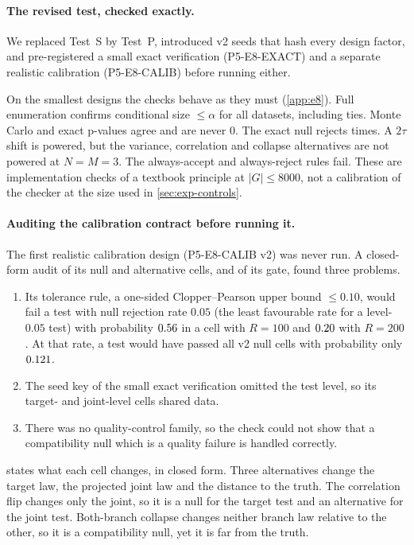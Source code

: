 \documentclass{article}
\theoremstyle{plain}
\theoremstyle{definition}
\theoremstyle{remark}
\begin{document}
\paragraph{The revised test, checked exactly.}\label{sec:e8summary}
We replaced Test~S by Test~P, introduced v2 seeds that hash every design factor, and pre-registered a small exact verification (P5-E8-EXACT) and a separate realistic calibration (P5-E8-CALIB) before running either.

On the smallest designs the checks behave as they must (\cref{app:e8}).
Full enumeration confirms conditional size $\le\alpha$ for all \numEeightAdatasets{} datasets, including ties. Monte Carlo and exact p-values agree and are never $0$. The exact null rejects \numEeightNullK{} times.
A $2\tau$ shift is powered, but the variance, correlation and collapse alternatives are not powered at $N=M=3$. The always-accept and always-reject rules fail.
These are implementation checks of a textbook principle at $|G|\le 8000$, not a calibration of the checker at the size used in \cref{sec:exp-controls}.

\paragraph{Auditing the calibration contract before running it.}
The first realistic calibration design (P5-E8-CALIB v2) was never run.
A closed-form audit of its null and alternative cells, and of its gate, found three problems.
\begin{enumerate}
\item Its tolerance rule, a one-sided Clopper--Pearson upper bound $\le0.10$, would fail a test with null rejection rate $0.05$ (the least favourable rate for a level-$0.05$ test) with probability $0.56$ in a cell with $R=100$ and $0.20$ with $R=200$. At that rate, a test would have passed all v2 null cells with probability only $0.121$.
\item The seed key of the small exact verification omitted the test level, so its target- and joint-level cells shared data.
\item There was no quality-control family, so the check could not show that a compatibility null which is a quality failure is handled correctly.
\end{enumerate}

 states what each cell changes, in closed form.
Three alternatives change the target law, the projected joint law and the distance to the truth. The correlation flip changes only the joint, so it is a null for the target test and an alternative for the joint test. Both-branch collapse changes neither branch law relative to the other, so it is a compatibility null, yet it is far from the truth.
\end{document}
